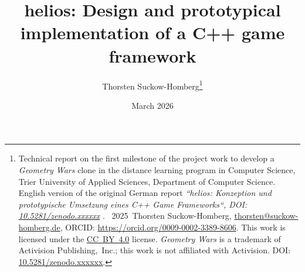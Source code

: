 \documentclass[a4paper,abstract=true]{scrartcl}
\begin{document}
    \title{\textbf{helios: Design and prototypical implementation of a C++ game framework}}


    \author{
        Thorsten Suckow-Homberg\thanks{%
            Technical report on the first milestone of the project work
            to develop a \textit{Geometry Wars} clone in the distance learning program in Computer Science,
            Trier University of Applied Sciences, Department of Computer Science.
            English version of the original German report
            \textit{``helios: Konzeption und prototypische Umsetzung eines C++ Game Frameworks``, DOI:  \href{https://doi.org/10.5281/zenodo.xxxxx}{10.5281/zenodo.xxxxxx}
            }. \newline
            \textcopyright\ 2025~Thorsten Suckow-Homberg,
            \href{mailto:thorsten@suckow-homberg.de}{thorsten@suckow-homberg.de},
            ORCID: \url{https://orcid.org/0009-0002-3389-8606}. \newline
            This work is licensed under the
            \href{https://creativecommons.org/licenses/by/4.0/}{CC~BY~4.0} license. \newline
            \textit{Geometry Wars} is a trademark of Activision Publishing,~Inc.;
            this work is not affiliated with Activision. \newline
            DOI: \href{https://doi.org/10.5281/zenodo.xxxxxx}{10.5281/zenodo.xxxxxx}.
        }%
    }



    \date{March 2026}

    \maketitle





    

    \clearpage
    \sloppy
    \printbibliography
    \fussy
\end{document}
